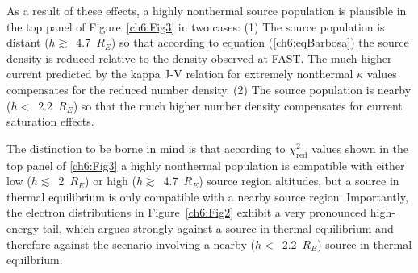
  As a result of these effects, a highly nonthermal source population is
  plausible in the top panel of Figure~\ref{ch6:Fig3} in two cases: (1) The
  source population is distant ($h \gtrsim$~4.7~$R_E$) so that according to
  equation (\ref{ch6:eqBarbosa}) the source density is reduced relative to the
  density observed at FAST. The much higher current predicted by the kappa J-V
  relation for extremely nonthermal $\kappa$ values compensates for the reduced
  number density. (2) The source population is nearby ($h <$~2.2~$R_E$) so that
  the much higher number density compensates for current saturation effects.

  The distinction to be borne in mind is that according to
  $\chi^2_{\mathrm{red}}$ values shown in the top panel of \ref{ch6:Fig3} a
  highly nonthermal population is compatible with either low
  ($h \lesssim$~2~$R_E$) or high ($h \gtrsim$~4.7~$R_E$) source region
  altitudes, but a source in thermal equilibrium is only compatible with a
  nearby source region. Importantly, the electron distributions in
  Figure~\ref{ch6:Fig2} exhibit a very pronounced high-energy tail, which argues
  strongly against a source in thermal equilibrium and therefore against the
  scenario involving a nearby ($h <$~2.2~$R_E$) source in thermal equilbrium.


